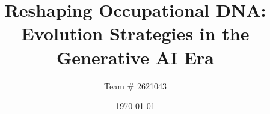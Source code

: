 \documentclass{mcmthesis} %
\title{Reshaping Occupational DNA: Evolution Strategies in the Generative AI Era}
\author{Team \# 2621043}
\date{\today}
\theoremstyle{scplain}
\begin{document}
\begin{abstract}

\end{abstract}

\maketitle
\tableofcontents 
\newpage












\newpage

\end{document}
